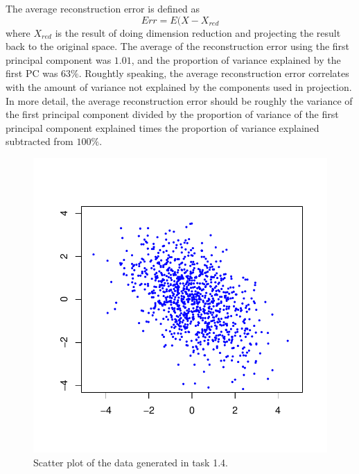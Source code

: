 \documentclass{article}
\begin{document}
The average reconstruction error is defined as
$$ Err = E(X-X_{red}$$
where $X_{red}$ is the result of doing dimension reduction and projecting the result back to the original space.
The average of the reconstruction error using the first principal component was
$1.01$, and the proportion of variance explained by the first PC was $63 \%$.
Roughtly speaking, the average reconstruction error correlates with the amount of variance not explained by the components used in projection.
In more detail, the average reconstruction error should be roughly the variance of the
first principal component divided by the proportion of variance of the
first principal component explained times the proportion of variance
explained subtracted from $100 \%$.
\begin{figure} \centering
	\includegraphics[scale=0.7]{vscatter}
	\caption{Scatter plot of the data generated in task 1.4.} \label{fig:vscatter}
\end{figure}
\end{document}
